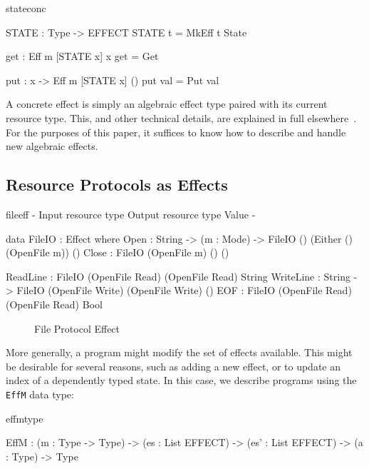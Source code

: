 \begin{SaveVerbatim}{stateconc}

STATE : Type -> EFFECT
STATE t = MkEff t State

get : Eff m [STATE x] x
get = Get 

put : x -> Eff m [STATE x] ()
put val = Put val

\end{SaveVerbatim}

\noindent
A concrete effect is simply an algebraic effect type paired with its current
resource type. This, and other
technical details, are explained in full elsewhere~\cite{brady:effects}.
For the purposes of this paper, it suffices to know how to describe and
handle new algebraic effects.

\subsection{Resource Protocols as Effects}
\label{rp-effects}
\begin{SaveVerbatim}{fileeff}
{-                                             { Input resource type }   { Output resource type } { Value } -}
 
data FileIO : Effect where
     Open      : String -> (m : Mode) -> FileIO     ()                    (Either () (OpenFile m)) ()
     Close     :                         FileIO     (OpenFile m)          ()                       ()

     ReadLine  :                         FileIO     (OpenFile Read)       (OpenFile Read)          String
     WriteLine : String ->               FileIO     (OpenFile Write)      (OpenFile Write)         ()
     EOF       :                         FileIO     (OpenFile Read)       (OpenFile Read)          Bool
\end{SaveVerbatim}

\begin{figure*}[t]
\begin{center}
\end{center}
\caption{File Protocol Effect}
\label{fig:fileeffect}
\end{figure*}
More generally, a program might modify the set of effects available.
This might be desirable for several reasons, such as adding a new
effect, or to update an index of a dependently typed state. In this
case, we describe programs using the \texttt{EffM} data type:

\begin{SaveVerbatim}{effmtype}

EffM : (m : Type -> Type) ->
       (es : List EFFECT) -> (es' : List EFFECT) ->
       (a : Type) -> Type

\end{SaveVerbatim}

